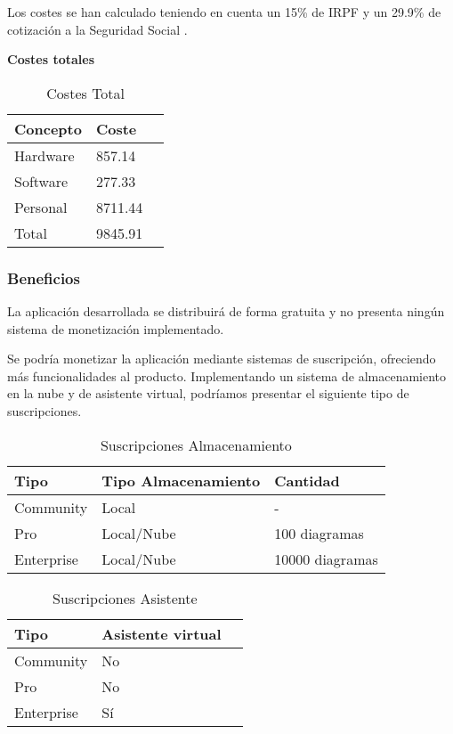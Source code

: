 Los costes se han calculado teniendo en cuenta un 15\% de IRPF \cite{ia:irpf} y un 29.9\% de cotización a la Seguridad Social \cite{ss:cotiz}.

\textbf{Costes totales}
\begin{table}[H]
    \centering
    \begin{tabular}{@{}lll@{}}\toprule
         \textbf{Concepto} & \textbf{Coste} \\ \midrule
         Hardware & 857.14 \\
         Software & 277.33\\
         Personal & 8711.44\\ \midrule
         Total & 9845.91\\ \bottomrule
    \end{tabular}
    \caption{Costes Total}
    \label{ve:cost-tot}
\end{table}

\subsubsection{Beneficios}
La aplicación desarrollada se distribuirá de forma gratuita y no presenta ningún sistema de monetización implementado.

Se podría monetizar la aplicación mediante sistemas de suscripción, ofreciendo más funcionalidades al producto. Implementando un sistema de almacenamiento en la nube y de asistente virtual, podríamos presentar el siguiente tipo de suscripciones.

\begin{table}[H]
    \centering
    \begin{tabular}{@{}lll@{}}\toprule
        \textbf{Tipo} & \textbf{Tipo Almacenamiento} & \textbf{Cantidad} \\ \midrule
        Community & Local & - \\
        Pro & Local/Nube & 100 diagramas \\
        Enterprise & Local/Nube & 10000 diagramas \\ \bottomrule
    \end{tabular}
    \caption{Suscripciones Almacenamiento}
    \label{ve:susc}
\end{table}

\begin{table}[H]
    \centering
    \begin{tabular}{@{}lll@{}}\toprule
        \textbf{Tipo} & \textbf{Asistente virtual} \\ \midrule
        Community & No \\
        Pro & No \\
        Enterprise & Sí \\ \bottomrule
    \end{tabular}
    \caption{Suscripciones Asistente}
    \label{ve:susc}
\end{table}

